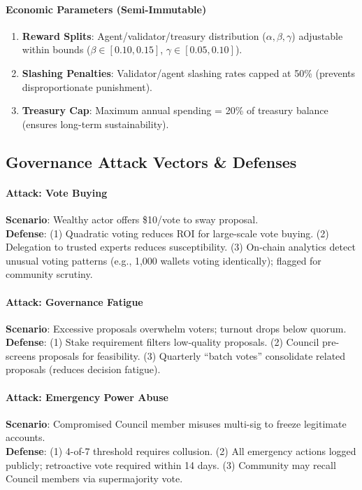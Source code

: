 \documentclass[11pt]{article}
\begin{document}
\paragraph{Economic Parameters (Semi-Immutable)}
\begin{enumerate}[noitemsep]
  \item \textbf{Reward Splits}: Agent/validator/treasury distribution ($\alpha, \beta, \gamma$) adjustable within bounds ($\beta \in [0.10, 0.15]$, $\gamma \in [0.05, 0.10]$).
  \item \textbf{Slashing Penalties}: Validator/agent slashing rates capped at 50\% (prevents disproportionate punishment).
  \item \textbf{Treasury Cap}: Maximum annual spending = 20\% of treasury balance (ensures long-term sustainability).
\end{enumerate}

\subsection{Governance Attack Vectors \& Defenses}

\paragraph{Attack: Vote Buying}
\textbf{Scenario}: Wealthy actor offers \$10/vote to sway proposal.\\
\textbf{Defense}: (1) Quadratic voting reduces ROI for large-scale vote buying. (2) Delegation to trusted experts reduces susceptibility. (3) On-chain analytics detect unusual voting patterns (e.g., 1,000 wallets voting identically); flagged for community scrutiny.

\paragraph{Attack: Governance Fatigue}
\textbf{Scenario}: Excessive proposals overwhelm voters; turnout drops below quorum.\\
\textbf{Defense}: (1) Stake requirement filters low-quality proposals. (2) Council pre-screens proposals for feasibility. (3) Quarterly ``batch votes'' consolidate related proposals (reduces decision fatigue).

\paragraph{Attack: Emergency Power Abuse}
\textbf{Scenario}: Compromised Council member misuses multi-sig to freeze legitimate accounts.\\
\textbf{Defense}: (1) 4-of-7 threshold requires collusion. (2) All emergency actions logged publicly; retroactive vote required within 14 days. (3) Community may recall Council members via supermajority vote.
\end{document}

